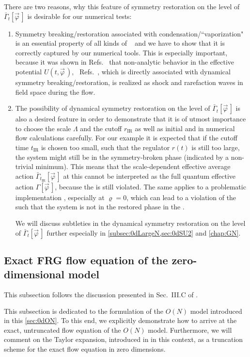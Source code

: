 There are two reasons, why this feature of symmetry restoration on the level of $\bar{\Gamma}_t [ \vec{\varphi} \, ]$ is desirable for our numerical tests:
	\begin{enumerate}
		\item	Symmetry breaking/restoration associated with condensation/``vaporization" is an essential property of all kinds of \qfts{}~\cite{Weinberg:1996kr,Peskin:1995ev,ZinnJustin:2002ru} and we have to show that it is correctly captured by our numerical tools.
		This is especially important, because it was shown in Refs.~\cite{Grossi:2019urj,Grossi:2021ksl} that non-analytic behavior in the effective potential $U ( t, \vec{\varphi} \, )$, \cf{}\ Refs.~\cite{Bonanno:2004pq,Aoki:2017rjl}, which is directly associated with dynamical symmetry breaking/restoration, is realized as shock and rarefaction waves in field space during the \frg{} flow.
		
		\item	The possibility of dynamical symmetry restoration on the level of $\bar{\Gamma}_t [ \vec{\varphi} \, ]$ is also a desired feature in order to demonstrate that it is of utmost importance to choose the \uv{} scale $\Lambda$ and the \ir{} cutoff $r_\mathrm{IR}$ as well as initial and \bcs{} in numerical \frg{} flow calculations carefully.
		For our example it is expected that if the \ir{} cutoff time $t_\mathrm{IR}$ is chosen too small, such that the regulator $r ( t )$ is still too large, the system might still be in the symmetry-broken phase (indicated by a non-trivial minimum).
		This means that the scale-dependent effective average action $\bar{\Gamma}_{t_\mathrm{IR}} [ \vec{\varphi} \, ]$ at this \rgscale{} cannot be interpreted as the full quantum effective action $\Gamma [ \vec{\varphi} \, ]$, because the \cmwhTheorem{} is still violated.
		The same applies to a problematic implementation \bcs{}, especially at $\varrho =  0$, which can lead to a violation of the \cmwhTheorem{} such that the system is not in the restored phase in the \ir{}.
		
		We will discuss subtleties in the dynamical symmetry restoration on the level of $\bar{\Gamma}_t [ \vec{\varphi} \, ]$ further especially in \cref{subsec:0dLargeN,sec:0dSU2} and \cref{chap:GN}.
	\end{enumerate}

\subsection{Exact FRG flow equation of the zero-dimensional \ON{} model}\label{subsec:FRG-formulationONmodel}
\begin{disclaimer}
	This subsection follows the discussion presented in Sec.~III.C of .
\end{disclaimer}
This subsection is dedicated to the \frg{} formulation of the $O(N)$ model introduced in this \cref{sec:0dON}.
To this end, we explicitly demonstrate how to arrive at the exact, untruncated \frg{} flow equation of the $O(N)$ model.
Furthermore, we will comment on the \frg{} Taylor expansion, introduced in \teRef{} in this context, as a truncation scheme for the exact flow equation in zero dimensions.

